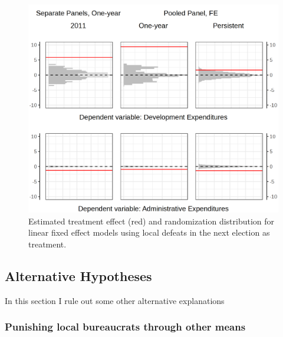 \documentclass[12pt]{article}\usepackage[]{graphicx}\usepackage[]{color}
\newcommand{\1}{\mathbbm{1}}
\begin{document}
\begin{figure}[!htbp]
	\centering
	\includegraphics[width=\textwidth]{figure/SYP_FE_MECH.png}
	\captionsetup{singlelinecheck=off}
	\caption[Estimated effects of future treatment]{Estimated treatment effect (red) and randomization distribution for linear fixed effect models using local defeats in the next election as treatment.}
	\label{fig:Mech}
\end{figure}

\subsection{Alternative Hypotheses}

In this section I rule out some other alternative explanations

\subsubsection{Punishing local bureaucrats through other means}
\end{document}
